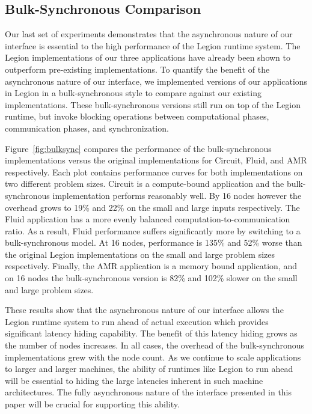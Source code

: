 

\subsection{Bulk-Synchronous Comparison}
\label{subsec:bulkcomp}

Our last set of experiments demonstrates that the asynchronous nature of our interface
is essential to the high performance of the Legion runtime system.  The Legion
implementations of our three applications have already been shown to outperform 
pre-existing implementations\cite{Legion12}.  To quantify the benefit of the asynchronous
nature of our interface, we implemented versions of our applications in
Legion in a bulk-synchronous style to compare against our existing implementations.  
These bulk-synchronous versions still run on top of 
the Legion runtime, but invoke blocking operations between computational phases,
communication phases, and synchronization.

Figure~\ref{fig:bulksync} compares
the performance of the bulk-synchronous implementations versus the original
implementations for Circuit, Fluid, and AMR respectively.  Each plot contains
performance curves for both implementations on two different problem sizes.
Circuit is a compute-bound application and the bulk-synchronous implementation
performs reasonably well.  By 16 nodes however the overhead grows to 19\%
and 22\% on the small and large inputs respectively.  The Fluid application 
has a more evenly balanced computation-to-communication ratio.  As a result,
Fluid performance suffers significantly more by switching to
a bulk-synchronous model.  At 16 nodes, performance is 135\% and 52\% worse
than the original Legion implementations on the small and large problem sizes
respectively.  Finally, the AMR application is a memory bound application, and on 16 nodes
the bulk-synchronous version is 82\% and 102\% slower on the small and
large problem sizes.

These results show that the asynchronous nature of our interface allows
the Legion runtime system to run ahead of actual execution which
provides significant latency hiding capability.  
The benefit of this latency hiding grows as the number of
nodes increases. %
In all cases, the overhead of the bulk-synchronous
implementations grew with the node count.  As we continue to scale
applications to larger and larger machines, the ability of runtimes like Legion to run ahead
will be essential to hiding the large latencies inherent in such machine architectures.
The fully asynchronous nature of the interface presented in this paper
will be crucial for supporting this ability.


